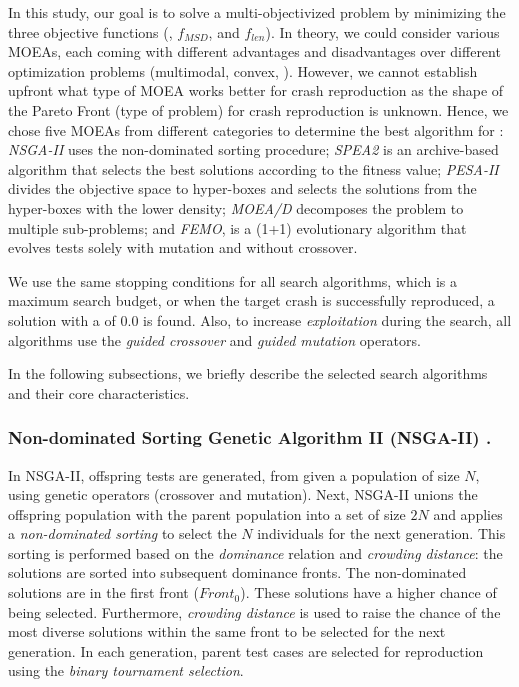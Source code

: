 In this study, our goal is to solve a multi-objectivized problem by minimizing the three objective functions (\CrashFunction, $f_{MSD}$, and $f_{len}$).
In theory, we could consider various MOEAs, each coming with different advantages and disadvantages over different optimization problems (\eg multimodal, convex, \etc).
However, we cannot establish upfront what type of MOEA works better for crash reproduction as the shape of the Pareto Front (\ie type of problem) for crash reproduction is unknown.
Hence, we chose five MOEAs from different categories to determine the best algorithm for \moho:
\textit{NSGA-II} uses the non-dominated sorting procedure; \textit{SPEA2} is an archive-based algorithm that selects the best solutions according to the fitness value; \textit{PESA-II} divides the objective space to hyper-boxes and selects the solutions from the hyper-boxes with the lower density; \textit{MOEA/D} decomposes the problem to multiple sub-problems; and \textit{FEMO}, is a (1+1) evolutionary algorithm that evolves tests solely with mutation and without crossover.

We use the same stopping conditions for all search algorithms,  which is a maximum search budget, or when the target crash is successfully reproduced, \ie a solution with a \CrashFunction of $0.0$ is found. Also, to increase \textit{exploitation} during the search, all algorithms use the \textit{guided crossover} and \textit{guided mutation} operators.

In the following subsections, we briefly describe the selected search algorithms and their core characteristics.

\subsubsection{Non-dominated Sorting Genetic Algorithm II (NSGA-II) \cite{deb2002fast}. } 
%
In NSGA-II, offspring tests are generated, from given a population of size $N$, using genetic operators (crossover and mutation). Next, NSGA-II unions the offspring population with the parent population into a set of size $2N$ and applies a \textit{non-dominated sorting} to select the $N$ individuals for the next generation.
This sorting is performed based on the \textit{dominance} relation and \textit{crowding distance}: the solutions are sorted into subsequent dominance fronts. The non-dominated solutions are in the first front ($Front_0$). These solutions have a higher chance of being selected. Furthermore, \textit{crowding distance} is used to raise the chance of the most diverse solutions within the same front to be selected for the next generation. 
In each generation, parent test cases are selected for reproduction using the \textit{binary tournament selection}. 

